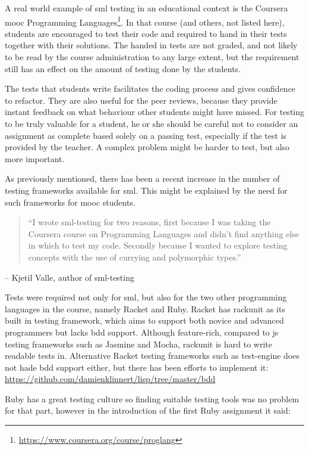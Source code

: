 \documentclass[11pt]{article}
\begin{document}
A real world example of \gls{sml} \gls{testing} in an educational context is the Coursera \gls{mooc} Programming Languages\footnote{\url{https://www.coursera.org/course/proglang}}.
In that course (and others, not listed here), students are encouraged to test their code and required to hand in their tests together with their solutions.
The handed in tests are not graded, and not likely to be read by the course administration to any large extent, but the requirement still has an effect on the amount of testing done by the students.

The tests that students write facilitates the coding process and gives confidence to refactor.
They are also useful for the peer reviews, because they provide instant feedback on what behaviour other students might have missed.
For testing to be truly valuable for a student, he or she should be careful not to consider an assignment as complete based solely on a passing test, especially if the test is provided by the teacher.
A complex problem might be harder to test, but also more important.

As previously mentioned, there has been a recent increase in the number of testing frameworks available for \gls{sml}. This might be explained by the need for such frameworks for \gls{mooc} students.

\begin{quote}
``I wrote sml-testing for two reasons, first because I was taking the Coursera course on Programming Languages and didn't find anything else in which to test my code. Secondly because I wanted to explore testing concepts with the use of currying and polymorphic types.''
\end{quote}

-- Kjetil Valle, author of sml-testing

Tests were required not only for \gls{sml}, but also for the two other programming languages in the course, namely Racket and Ruby.
Racket has rackunit as its built in testing framework, which aims to support both novice and advanced programmers but lacks \gls{bdd} support.
Although feature-rich, compared to \gls{js} testing frameworks such as Jasmine and Mocha, rackunit is hard to write readable tests in.
Alternative Racket testing frameworks such as test-engine does not hade \gls{bdd} support either, but there has been efforts to implement it: \url{https://github.com/damienklinnert/lisp/tree/master/bdd}

Ruby has a great testing culture so finding suitable testing tools was no problem for that part, however in the introduction of the first Ruby assignment it said:
\end{document}
